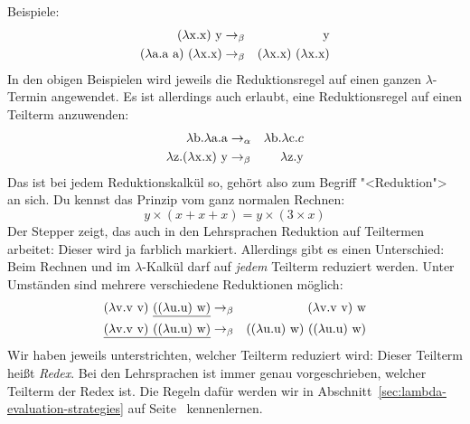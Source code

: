 Beispiele:
%
\begin{eqnarray*}
  (\lambda \mathrm x.\mathrm x)~\mathrm y & \rightarrow_{\beta} & \mathrm y\\
  (\lambda \mathrm a.\mathrm a~\mathrm a)~(\lambda \mathrm x.\mathrm x) & \rightarrow_{\beta}
  & (\lambda \mathrm x.\mathrm x)~(\lambda \mathrm x.\mathrm x)
\end{eqnarray*}
%
In den obigen Beispielen wird jeweils die Reduktionsregel auf einen
ganzen $\lambda$-Termin angewendet.  Es ist allerdings auch erlaubt,
eine Reduktionsregel auf einen Teilterm anzuwenden:
%
\begin{eqnarray*}
  \lambda \mathrm b.\lambda \mathrm a.\mathrm a & \rightarrow_{\alpha} & \lambda \mathrm b.\lambda \mathrm c.c\\
  \lambda \mathrm z.(\lambda \mathrm x.\mathrm x)~\mathrm y & \rightarrow_{\beta}
                                                              & \lambda \mathrm z.\mathrm y
\end{eqnarray*}
%
Das ist bei jedem Reduktionskalkül so, gehört also zum Begriff
"<Reduktion"> an sich.  Du kennst das Prinzip vom ganz normalen
Rechnen:
%
\begin{displaymath}
  y \times (x + x + x) = y \times (3\times x)
\end{displaymath}
%
Der Stepper zeigt, das auch in den Lehrsprachen Reduktion auf
Teiltermen arbeitet: Dieser wird ja farblich markiert.  Allerdings
gibt es einen Unterschied: Beim Rechnen und im $\lambda$-Kalkül darf
auf \emph{jedem} Teilterm reduziert werden.  Unter Umständen sind
mehrere verschiedene Reduktionen möglich:
%
\begin{eqnarray*}
  (\lambda \mathrm v .\mathrm v~\mathrm v)~\underline{((\lambda \mathrm u.\mathrm u)~\mathrm w)}
  & \rightarrow_{\beta} & (\lambda \mathrm v .\mathrm v~\mathrm v)~\mathrm w\\
  \underline{(\lambda \mathrm v .\mathrm v~\mathrm v)~((\lambda \mathrm u.\mathrm u)~\mathrm w)}
  & \rightarrow_{\beta} & ((\lambda \mathrm u.\mathrm u)~\mathrm w)~((\lambda \mathrm u.\mathrm u)~\mathrm w)
\end{eqnarray*}
%
Wir haben jeweils unterstrichten, welcher Teilterm reduziert wird:
Dieser Teilterm heißt \textit{Redex}.  Bei den
Lehrsprachen ist immer genau vorgeschrieben, welcher Teilterm der
Redex ist.  Die Regeln dafür werden wir in
Abschnitt~\ref{sec:lambda-evaluation-strategies} auf
Seite~\pageref{sec:lambda-evaluation-strategies} kennenlernen.


